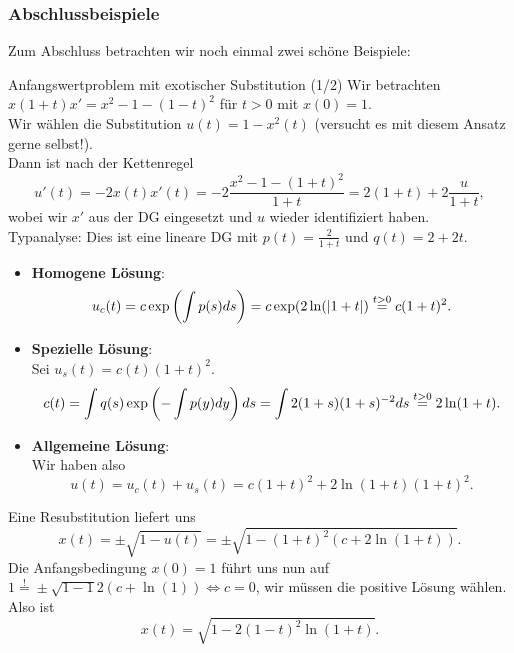 \subsubsection{Abschlussbeispiele}
Zum Abschluss betrachten wir noch einmal zwei schöne Beispiele:
\begin{Beispiel}
{Anfangswertproblem mit exotischer Substitution (1/2)}
Wir betrachten $\boxed{x(1+t)x'=x^2-1-(1-t)^2}$ für $t>0$ mit $x(0)=1$.\\
Wir wählen die Substitution $u(t)=1-x^2(t)$ (versucht es mit diesem Ansatz gerne selbst!).\\
Dann ist nach der Kettenregel
\begin{equation*}
    u'(t)=-2x(t)x'(t) =-2\frac{x^2-1-(1+t)^2}{1+t}=2(1+t)+2\frac{u}{1+t},
\end{equation*}
wobei wir $x'$ aus der DG eingesetzt und $u$ wieder identifiziert haben.\\
Typanalyse: Dies ist eine lineare DG mit $p(t)=\frac{2}{1+t}$ und $q(t)=2+2t$.
\begin{itemize}
    \item \textbf{Homogene Lösung}:
    \begin{equation*}
        u_c(t)=c\exp\left({\int p(s)ds}\right)=c\exp(2\ln(\left|{1+t}\right|)\overset{t>0}{=}c(1+t)^2.
    \end{equation*}
    \item \textbf{Spezielle Lösung}:\\
    Sei $u_s(t)=c(t)(1+t)^2$.
    \begin{equation*}
        c(t)=\int q(s)\exp\left({-\int p(y)dy}\right)ds=\int 2(1+s)(1+s)^{-2}ds\overset{t>0}{=}2\ln(1+t).
    \end{equation*}
    \item \textbf{Allgemeine Lösung}:\\
    Wir haben also
    \begin{equation*}
        u(t)=u_c(t)+u_s(t)=c(1+t)^2+2\ln(1+t)(1+t)^2.
    \end{equation*}
\end{itemize}
Eine Resubstitution liefert uns
\begin{equation*}
    x(t)=\pm\sqrt{1-u(t)}=\pm \sqrt{1-(1+t)^2(c+2\ln(1+t))}.
\end{equation*}
Die Anfangsbedingung $x(0)=1$ führt uns nun auf $1\overset{!}{=}\pm\sqrt{1-1}2(c+\ln(1))\iff c=0$, wir müssen die positive Lösung wählen. Also ist
\begin{equation*}
    x(t)=\sqrt{1-2(1-t)^2\ln(1+t)}.
\end{equation*}
\end{Beispiel}

